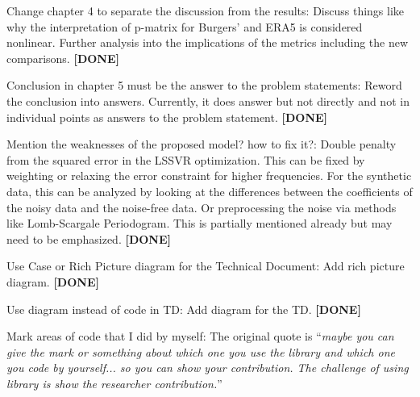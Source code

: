\documentclass[a4paper,12pt]{scrreprt}
\begin{document}
\begin{numdesc}
    \item[Change chapter 4 to separate the discussion from the results:] Discuss things like why the interpretation of p-matrix for Burgers' and ERA5 is considered nonlinear. Further analysis into the implications of the metrics including the new comparisons. \textbf{[DONE]}
    \item[Conclusion in chapter 5 must be the answer to the problem statements:] Reword the conclusion into answers. Currently, it does answer but not directly and not in individual points as answers to the problem statement. \textbf{[DONE]}
    \item[Mention the weaknesses of the proposed model? how to fix it?:] Double penalty from the squared error in the LSSVR optimization. This can be fixed by weighting or relaxing the error constraint for higher frequencies. For the synthetic data, this can be analyzed by looking at the differences between the coefficients of the noisy data and the noise-free data. Or preprocessing the noise via methods like Lomb-Scargale Periodogram. This is partially mentioned already but may need to be emphasized. \textbf{[DONE]}
    \item[Use Case or Rich Picture diagram for the Technical Document:] Add rich picture diagram. \textbf{[DONE]}
    \item[Use diagram instead of code in TD:] Add diagram for the TD. \textbf{[DONE]}
    \item[Mark areas of code that I did by myself:] The original quote is \enquote{\emph{maybe you can give the mark or something about which one you use the library and which one you code by yourself... so you can show your contribution. The challenge of using library is show the researcher contribution.}}


\end{numdesc}
\end{document}
